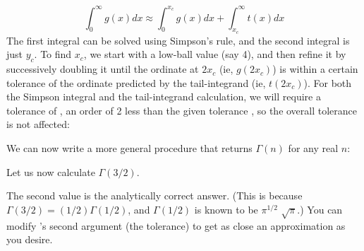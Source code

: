 $$
\int_0^{\infty} g(x) dx \approx 
\int_0^{x_c} g(x) dx +
\int_{x_c}^{\infty} t(x) dx 
$$
%
The first integral can be solved using Simpson's rule,
and the second integral is just $y_c$.  To find $x_c$,
we start with a low-ball value (say 4), and then refine
it by successively doubling it until the ordinate at
$2x_c$ (ie, $g(2x_c)$) is within a certain
tolerance of the ordinate predicted by the tail-integrand 
(ie, $t(2x_c)$).  For both the Simpson
integral and the tail-integrand calculation, we will
require a tolerance of , an order of 2 less than
the given tolerance , so the overall
tolerance is not affected:


\n We can now write a more general procedure 
that returns $\Gamma(n)$ for any real $n$:


\n
Let us now calculate $\Gamma(3/2)$.


\n The second value is the analytically correct answer.
(This is because $\Gamma(3/2) =
(1/2)\Gamma(1/2)$, and $\Gamma(1/2)$ is known to be
\ifx\shipout\UNDEFINED
$\pi^{1/2}$\else
$\sqrt{\pi}$\fi.)
You can modify 's  second
argument (the tolerance) to get as close an
approximation as you desire.




